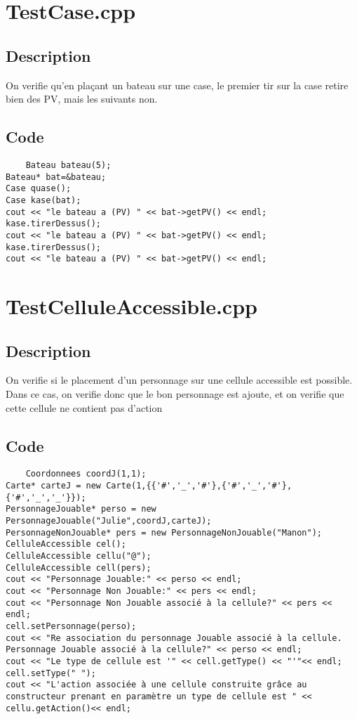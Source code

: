     \section{TestCase.cpp}
        \subsection{Description}
            On verifie qu'en plaçant un bateau sur une case, le premier tir sur la case retire bien des PV, mais les suivants non.
        \subsection{Code}
\begin{lstlisting}
	Bateau bateau(5);
Bateau* bat=&bateau;
Case quase();
Case kase(bat);
cout << "le bateau a (PV) " << bat->getPV() << endl;
kase.tirerDessus();
cout << "le bateau a (PV) " << bat->getPV() << endl;
kase.tirerDessus();
cout << "le bateau a (PV) " << bat->getPV() << endl;
	\end{lstlisting}
    \section{TestCelluleAccessible.cpp}
        \subsection{Description}
            On verifie si le placement d'un personnage sur une cellule accessible est possible.\\
            Dans ce cas, on verifie donc que le bon personnage est ajoute, et on verifie que cette cellule ne contient pas d'action
        \subsection{Code}
\begin{lstlisting}
	Coordonnees coordJ(1,1);
Carte* carteJ = new Carte(1,{{'#','_','#'},{'#','_','#'},{'#','_','_'}});
PersonnageJouable* perso = new PersonnageJouable("Julie",coordJ,carteJ);
PersonnageNonJouable* pers = new PersonnageNonJouable("Manon");
CelluleAccessible cel();
CelluleAccessible cellu("@");
CelluleAccessible cell(pers);
cout << "Personnage Jouable:" << perso << endl;
cout << "Personnage Non Jouable:" << pers << endl;
cout << "Personnage Non Jouable associé à la cellule?" << pers << endl;
cell.setPersonnage(perso);
cout << "Re association du personnage Jouable associé à la cellule. Personnage Jouable associé à la cellule?" << perso << endl;
cout << "Le type de cellule est '" << cell.getType() << "'"<< endl;
cell.setType(" ");
cout << "L'action associée à une cellule construite grâce au constructeur prenant en paramètre un type de cellule est " << cellu.getAction()<< endl;
	\end{lstlisting}
